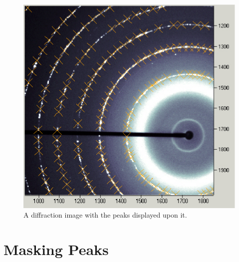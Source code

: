 \begin{figure}
    \centering
    \includegraphics[scale=.75]
    {figures/peaks_on_diffraction_image.eps}
    \caption{A diffraction image with the peaks displayed upon it.}
    \label{peaks_on_diffraction_image}
\end{figure}

\section{Masking Peaks}

